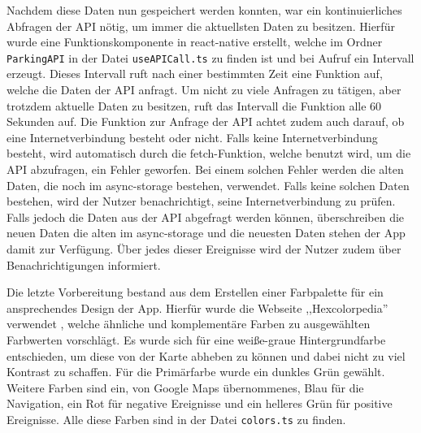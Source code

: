 Nachdem diese Daten nun gespeichert werden konnten, war ein kontinuierliches Abfragen der API nötig, um immer die aktuellsten Daten zu besitzen. Hierfür wurde eine Funktionskomponente in react-native erstellt, welche im Ordner \verb|ParkingAPI| in der Datei \verb|useAPICall.ts| zu finden ist und bei Aufruf ein Intervall erzeugt. Dieses Intervall ruft nach einer bestimmten Zeit eine Funktion auf, welche die Daten der API anfragt. Um nicht zu viele Anfragen zu tätigen, aber trotzdem aktuelle Daten zu besitzen, ruft das Intervall die Funktion alle 60 Sekunden auf. Die Funktion zur Anfrage der API achtet zudem auch darauf, ob eine Internetverbindung besteht oder nicht. Falls keine Internetverbindung besteht, wird automatisch durch die fetch-Funktion, welche benutzt wird, um die API abzufragen, ein Fehler geworfen. Bei einem solchen Fehler werden die alten Daten, die noch im async-storage bestehen, verwendet. Falls keine solchen Daten bestehen, wird der Nutzer benachrichtigt, seine Internetverbindung zu prüfen. Falls jedoch die Daten aus der API abgefragt werden können, überschreiben die neuen Daten die alten im async-storage und die neuesten Daten stehen der App damit zur Verfügung. Über jedes dieser Ereignisse wird der Nutzer zudem über Benachrichtigungen informiert.

Die letzte Vorbereitung bestand aus dem Erstellen einer Farbpalette für ein ansprechendes Design der App. Hierfür wurde die Webseite ,,Hexcolorpedia'' verwendet \cite{colors}, welche ähnliche und komplementäre Farben zu ausgewählten Farbwerten vorschlägt. Es wurde sich für eine weiße-graue Hintergrundfarbe entschieden, um diese von der Karte abheben zu können und dabei nicht zu viel Kontrast zu schaffen. Für die Primärfarbe wurde ein dunkles Grün gewählt. Weitere Farben sind ein, von Google Maps übernommenes, Blau für die Navigation, ein Rot für negative Ereignisse und ein helleres Grün für positive Ereignisse. Alle diese Farben sind in der Datei \verb|colors.ts| zu finden.

